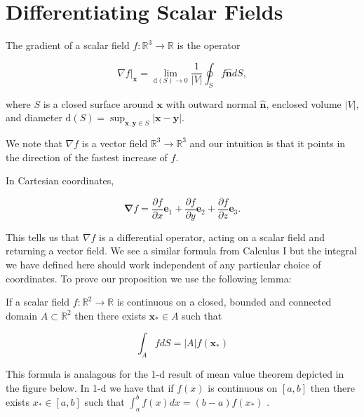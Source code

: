 \section{Differentiating Scalar Fields}

\begin{definition}
  The gradient of a scalar field $f: \mathbb{R}^3 \rightarrow \mathbb{R}$ is the operator

$$
\left.\nabla f\right|_{\boldsymbol{x}}=\lim _{\mathrm{d}(S) \rightarrow 0} \frac{1}{|V|} \oint_S f \hat{\boldsymbol{n}} d S,
$$

where $S$ is a closed surface around $\boldsymbol{x}$ with outward normal $\hat{\boldsymbol{n}}$, enclosed volume $|V|$, and diameter $\mathrm{d}(S)=\sup _{\boldsymbol{x}, \boldsymbol{y} \in S}|\boldsymbol{x}-\boldsymbol{y}|$.
\end{definition}

\begin{rem}
  We note that $\nabla f$ is a vector field $\mathbb{R}^3 \rightarrow \mathbb{R}^3$ and our intuition is that it points in the direction of the fastest increase of $f$. 
\end{rem}

\begin{proposition}
  In Cartesian coordinates,

$$
\boldsymbol{\nabla} f=\frac{\partial f}{\partial x} \boldsymbol{e}_1+\frac{\partial f}{\partial y} \boldsymbol{e}_2+\frac{\partial f}{\partial z} \boldsymbol{e}_3 .
$$
\end{proposition}

\noindent This tells us that $\nabla f$ is a differential operator, acting on a scalar field and returning a vector field. We see a similar formula from Calculus I but the integral we have defined here should work independent of any particular choice of coordinates. To prove our proposition we use the following lemma:

\begin{lemma}
  If a scalar field $f: \mathbb{R}^2 \rightarrow \mathbb{R}$ is continuous on a closed, bounded and connected domain $A \subset \mathbb{R}^2$ then there exists $\boldsymbol{x}_* \in A$ such that

$$
\int_A f d S=|A| f\left(\boldsymbol{x}_*\right)
$$
\end{lemma}

\noindent This formula is analagous for the 1-d result of mean value theorem depicted in the figure below. In 1-d we have that if $f(x)$ is continuous on $[a,b]$ then there exists $x_* \in [a,b]$ such that $\int_a^b f(x) d x=(b-a) f\left(x_*\right)$ .



